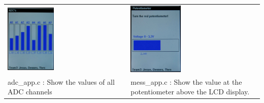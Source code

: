 \begin{tabular}{ p{8cm}  p{8cm} }
  \includegraphics[width=0.4\textwidth]{adcs.jpg} & \includegraphics[width=0.4\textwidth]{potent.jpg}\\
   adc\_app.c : Show the values of all ADC channels & mess\_app.c : Show the value at the potentiometer above the LCD display. \\
\end{tabular}


\newpage



